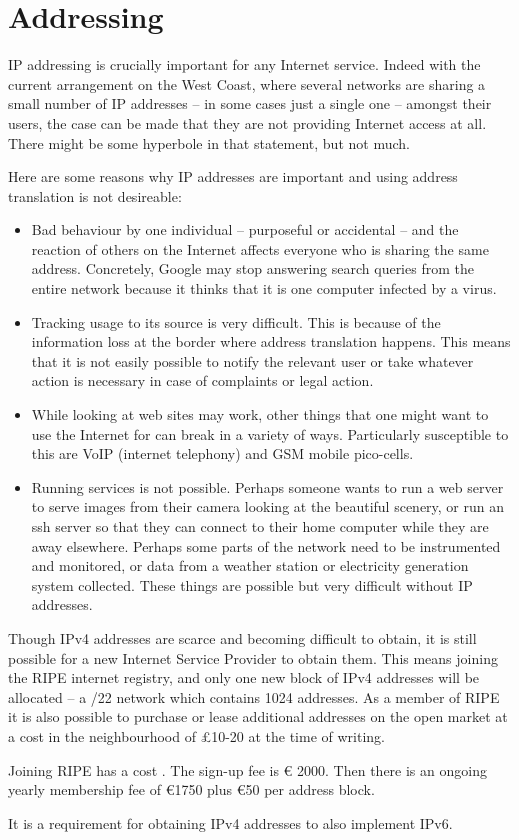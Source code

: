 \section{Addressing}

IP addressing is crucially important for any Internet service. Indeed
with the current arrangement on the West Coast, where several networks
are sharing a small number of IP addresses -- in some cases just a
single one -- amongst their users, the case can be made that they are
not providing Internet access at all. There might be some hyperbole in
that statement, but not much.

Here are some reasons why IP addresses are important and using address
translation is not desireable:
\begin{itemize}
  \item Bad behaviour by one individual -- purposeful or accidental --
    and the reaction of others on the Internet affects everyone who is
    sharing the same address. Concretely, Google may stop answering
    search queries from the entire network because it thinks that it
    is one computer infected by a virus.
  \item Tracking usage to its source is very difficult. This is
    because of the information loss at the border where address
    translation happens. This means that it is not easily possible to
    notify the relevant user or take whatever action is necessary in
    case of complaints or legal action.
  \item While looking at web sites may work, other things that one
    might want to use the Internet for can break in a variety of
    ways. Particularly susceptible to this are VoIP (internet
    telephony) and GSM mobile pico-cells.
  \item Running services is not possible. Perhaps someone wants to run
    a web server to serve images from their camera looking at the
    beautiful scenery, or run an ssh server so that they can connect
    to their home computer while they are away elsewhere. Perhaps some
    parts of the network need to be instrumented and monitored, or
    data from a weather station or electricity generation system
    collected. These things are possible but very difficult without IP
    addresses.
\end{itemize}

Though IPv4 addresses are scarce and becoming difficult to obtain, it
is still possible for a new Internet Service Provider to obtain
them. This means joining the RIPE internet registry, and only one
new block of IPv4 addresses will be allocated -- a /22 network which
contains 1024 addresses. As a member of RIPE it is also possible to
purchase or lease additional addresses on the open market at a cost in
the neighbourhood of \pounds 10-20 at the time of writing.

Joining RIPE has a cost \cite{RIPECharges}. The sign-up fee is \euro
2000. Then there is an ongoing yearly membership fee of \euro 1750
plus \euro 50 per address block.

It is a requirement for obtaining IPv4 addresses to also implement
IPv6.
